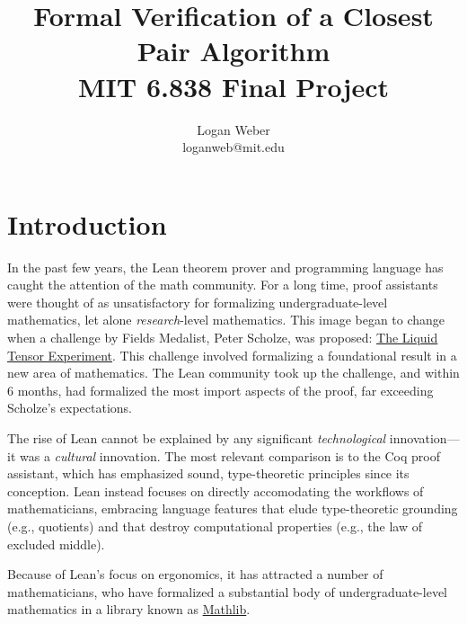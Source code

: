 \documentclass{article}
\begin{document}
\title{%
  Formal Verification of a Closest Pair Algorithm
  \\[0.5em]
  \large MIT 6.838 Final Project \\
}

\author{
Logan Weber\\
loganweb@mit.edu
}

\def\aSigma{\overline{\Sigma}}
\def\asigma{\overline{\sigma}}
\def\aheap{\overline{h}}

\date{}

\maketitle

\tableofcontents

\section{Introduction}
In the past few years, the Lean theorem prover and programming language has caught the attention of the math community.
For a long time, proof assistants were thought of as unsatisfactory for formalizing undergraduate-level mathematics, let alone \textit{research}-level mathematics.
This image began to change when a challenge by Fields Medalist, Peter Scholze, was proposed: \href{https://xenaproject.wordpress.com/2020/12/05/liquid-tensor-experiment/}{The Liquid Tensor Experiment}.
This challenge involved formalizing a foundational result in a new area of mathematics.
The Lean community took up the challenge, and within 6 months, had formalized the most import aspects of the proof, far exceeding Scholze's expectations.

The rise of Lean cannot be explained by any significant \textit{technological} innovation---it was a \textit{cultural} innovation.
The most relevant comparison is to the Coq proof assistant, which has emphasized sound, type-theoretic principles since its conception.
Lean instead focuses on directly accomodating the workflows of mathematicians, embracing language features that elude type-theoretic grounding (e.g., quotients) and that destroy computational properties (e.g., the law of excluded middle).

Because of Lean's focus on ergonomics, it has attracted a number of mathematicians, who have formalized a substantial body of undergraduate-level mathematics in a library known as \href{https://leanprover-community.github.io}{Mathlib}.
\end{document}
